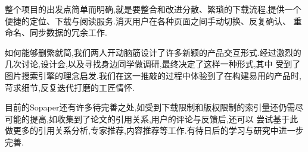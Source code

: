整个项目的出发点简单而明确,就是要整合和改进分散、繁琐的下载流程,提供一个便捷的定位、下载与阅读服务.消灭用户在各种页面之间手动切换、反复确认、 重命名、同步数据的冗余工作.


如何能够删繁就简,我们两人开动脑筋设计了许多新颖的产品交互形式.经过激烈的几次讨论,设计会,以及寻找身边同学做调研,最终决定了这样一种形式,其中 受到了图片搜索引擎的理念启发.我们在这一推敲的过程中体验到了在构建易用的产品时,苛求细节,反复迭代打磨的工匠情怀.

目前的Sopaper还有许多待完善之处,如受到下载限制和版权限制的索引量还仍需尽可能的提高,如收集到了论文的引用关系,用户的评论与反馈后,还可以 尝试基于此做更多的引用关系分析,专家推荐,内容推荐等工作.有待日后的学习与研究中进一步完善.
